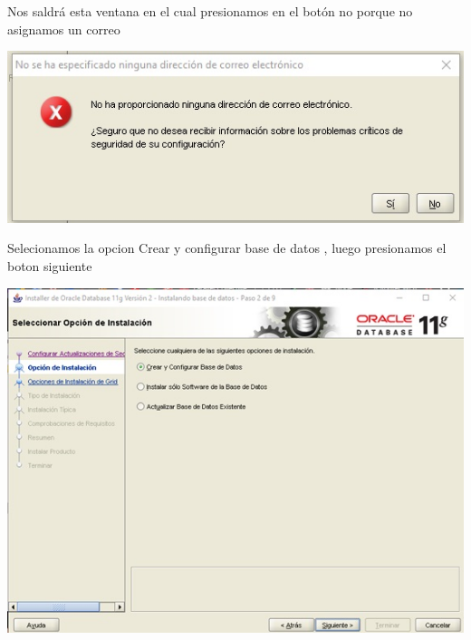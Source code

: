 \begin{flushleft}
\begin{center}
\end{center}
Nos saldrá esta ventana en el cual presionamos en el botón no porque no asignamos un correo\\
\begin{center}
\includegraphics{images/image-06}\\
\end{center}
Selecionamos la opcion Crear y configurar base de datos , luego presionamos el boton siguiente\\
\begin{center}
\includegraphics{images/image-07}\\
\end{center}
\end{flushleft}